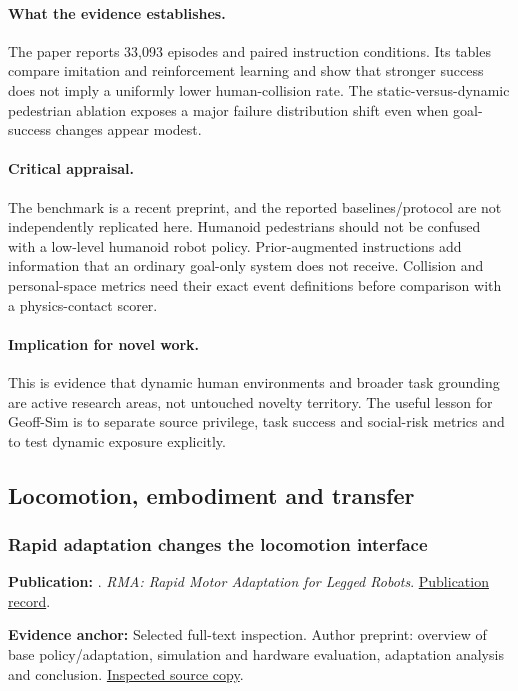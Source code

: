 \paragraph{What the evidence establishes.} The paper reports 33,093 episodes and paired instruction conditions. Its tables compare imitation and reinforcement learning and show that stronger success does not imply a uniformly lower human-collision rate. The static-versus-dynamic pedestrian ablation exposes a major failure distribution shift even when goal-success changes appear modest.

\paragraph{Critical appraisal.} The benchmark is a recent preprint, and the reported baselines/protocol are not independently replicated here. Humanoid pedestrians should not be confused with a low-level humanoid robot policy. Prior-augmented instructions add information that an ordinary goal-only system does not receive. Collision and personal-space metrics need their exact event definitions before comparison with a physics-contact scorer.

\paragraph{Implication for novel work.} This is evidence that dynamic human environments and broader task grounding are active research areas, not untouched novelty territory. The useful lesson for Geoff-Sim is to separate source privilege, task success and social-risk metrics and to test dynamic exposure explicitly.

\subsection{Locomotion, embodiment and transfer}
\subsubsection{Rapid adaptation changes the locomotion interface}\label{paper:rma}
\textbf{Publication:} \citet{rma}. \emph{RMA: Rapid Motor Adaptation for Legged Robots}. \href{https://doi.org/10.15607/rss.2021.xvii.011}{Publication record}.

\textbf{Evidence anchor:} Selected full-text inspection. Author preprint: overview of base policy/adaptation, simulation and hardware evaluation, adaptation analysis and conclusion. \href{https://arxiv.org/pdf/2107.04034}{Inspected source copy}.

